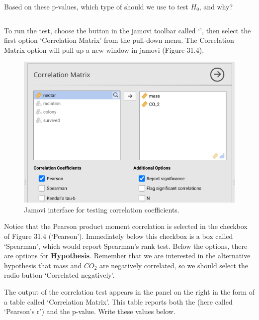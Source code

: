 \documentclass[
  openany]{krantz}
\begin{document}
Based on these p-values, which type of  should we use to test \(H_{0}\), and why?

\begin{verbatim}

\end{verbatim}

To run the  test, choose the button in the jamovi toolbar called `', then select the first option `Correlation Matrix' from the pull-down menu.
The Correlation Matrix option will pull up a new window in jamovi (Figure 31.4).

\begin{figure}
\includegraphics[width=1\linewidth]{img/jamovi_correlation_interface} \caption{Jamovi interface for testing correlation coefficients.}\label{fig:unnamed-chunk-136}
\end{figure}

Notice that the Pearson product moment correlation is selected in the checkbox of Figure 31.4 (`Pearson').
Immediately below this checkbox is a box called `Spearman', which would report Spearman's rank  test.
Below the \textbf{} options, there are options for \textbf{Hypothesis}.
Remember that we are interested in the alternative hypothesis that mass and \(CO_{2}\) are negatively correlated, so we should select the radio button `Correlated negatively'.

The output of the correlation test appears in the panel on the right in the form of a table called `Correlation Matrix'.
This table reports both the  (here called `Pearson's r') and the p-value.
Write these values below.
\end{document}
